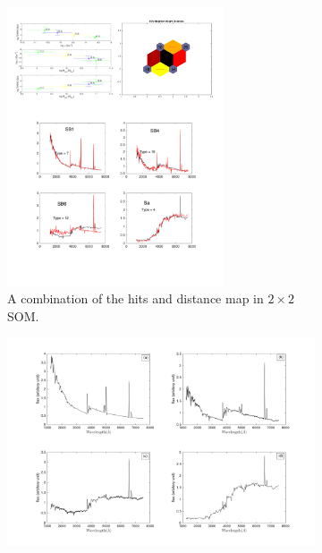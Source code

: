     \begin{figure}
        \centering
        \begin{subfigure}[b]{0.5\textwidth}
            \centering
            \includegraphics[width=0.7\textwidth]{../images/test_model/2by2_nei3.pdf}
            \caption{A combination of the hits and distance map in $2\times2$ SOM. }
             \label{fig: testmodel2by2}
        \end{subfigure}
        \hfill
        \begin{subfigure}[b]{0.5\textwidth} 
            \centering
            \includegraphics[width=\textwidth]{../images/test_model/SED_total2by2nei3.png}

\end{subfigure}
\end{figure}
